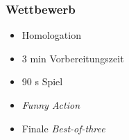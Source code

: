 \begin{frame}
	\frametitle{Wettbewerb}
	
	\begin{itemize}
		\item Homologation
	\end{itemize}
	\begin{itemize}
		\item 3 min Vorbereitungszeit
		\item 90 s Spiel
		\item \textit{Funny Action}
	\end{itemize}
	\begin{itemize}
		\item Finale \textit{Best-of-three}
	\end{itemize}
\end{frame}